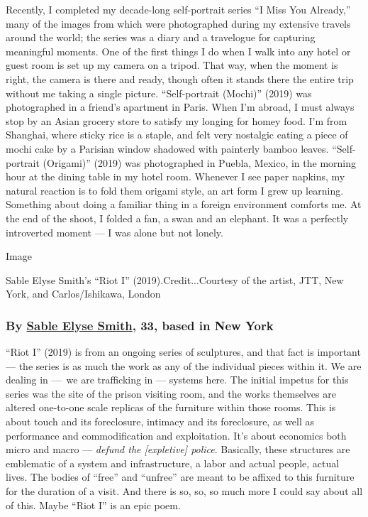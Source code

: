 Recently, I completed my decade-long self-portrait series ``I Miss You
Already,'' many of the images from which were photographed during my
extensive travels around the world; the series was a diary and a
travelogue for capturing meaningful moments. One of the first things I
do when I walk into any hotel or guest room is set up my camera on a
tripod. That way, when the moment is right, the camera is there and
ready, though often it stands there the entire trip without me taking a
single picture. ``Self-portrait (Mochi)'' (2019) was photographed in a
friend's apartment in Paris. When I'm abroad, I must always stop by an
Asian grocery store to satisfy my longing for homey food. I'm from
Shanghai, where sticky rice is a staple, and felt very nostalgic eating
a piece of mochi cake by a Parisian window shadowed with painterly
bamboo leaves. ``Self-portrait (Origami)'' (2019) was photographed in
Puebla, Mexico, in the morning hour at the dining table in my hotel
room. Whenever I see paper napkins, my natural reaction is to fold them
origami style, an art form I grew up learning. Something about doing a
familiar thing in a foreign environment comforts me. At the end of the
shoot, I folded a fan, a swan and an elephant. It was a perfectly
introverted moment --- I was alone but not lonely.

Image

Sable Elyse Smith's ``Riot I'' (2019).Credit...Courtesy of the artist,
JTT, New York, and Carlos/Ishikawa, London

\hypertarget{by-sable-elyse-smith-33-based-in-new-york}{%
\subsubsection{\texorpdfstring{\textbf{By}
\textbf{\href{http://sableelysesmith.com/}{Sable Elyse Smith}, 33, based
in New
York}}{By Sable Elyse Smith, 33, based in New York}}\label{by-sable-elyse-smith-33-based-in-new-york}}

``Riot I'' (2019) is from an ongoing series of sculptures, and that fact
is important --- the series is as much the work as any of the individual
pieces within it. We are dealing in ---~we are trafficking in ---
systems here. The initial impetus for this series was the site of the
prison visiting room, and the works themselves are altered one-to-one
scale replicas of the furniture within those rooms. This is about touch
and its foreclosure, intimacy and its foreclosure, as well as
performance and commodification and exploitation. It's about economics
both micro and macro --- \emph{defund the {[}expletive{]} police}.
Basically, these structures are emblematic of a system and
infrastructure, a labor and actual people, actual lives. The bodies of
``free'' and ``unfree'' are meant to be affixed to this furniture for
the duration of a visit. And there is so, so, so much more I could say
about all of this. Maybe ``Riot I'' is an epic poem.

